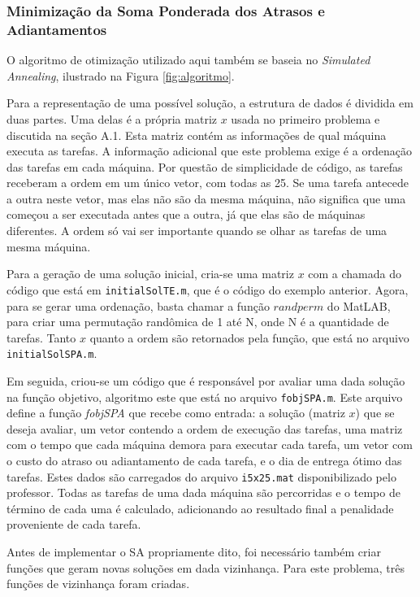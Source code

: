 \documentclass[conference]{IEEEtran}
\begin{document}
\subsubsection{Minimização da Soma Ponderada dos Atrasos e Adiantamentos}
O algoritmo de otimização utilizado aqui também se baseia no \textit{Simulated Annealing}, ilustrado na Figura \ref{fig:algoritmo}.

Para a representação de uma possível solução, a estrutura de dados é dividida em duas partes. Uma delas é a própria matriz $x$ usada no primeiro problema e discutida na seção A.1. Esta matriz contém as informações de qual máquina executa as tarefas. A informação adicional que este problema exige é a ordenação das tarefas em cada máquina. Por questão de simplicidade de código, as tarefas receberam a ordem em um único vetor, com todas as 25. Se uma tarefa antecede a outra neste vetor, mas elas não são da mesma máquina, não significa que uma começou a ser executada antes que a outra, já que elas são de máquinas diferentes. A ordem só vai ser importante quando se olhar as tarefas de uma mesma máquina. 

Para a geração de uma solução inicial, cria-se uma matriz $x$ com a chamada do código que está em \texttt{initialSolTE.m}, que é o código do exemplo anterior. Agora, para se gerar uma ordenação, basta chamar a função $randperm$ do MatLAB, para criar uma permutação randômica de 1 até N, onde N é a quantidade de tarefas. Tanto $x$ quanto a ordem são retornados pela função, que está no arquivo \texttt{initialSolSPA.m}.

Em seguida, criou-se um código que é responsável por avaliar uma dada solução na função objetivo, algoritmo este que está no arquivo \texttt{fobjSPA.m}. Este arquivo define a função \emph{fobjSPA} que recebe como entrada: a solução (matriz $x$) que se deseja avaliar, um vetor contendo a ordem de execução das tarefas, uma matriz com o tempo que cada máquina demora para executar cada tarefa, um vetor com o custo do atraso ou adiantamento de cada tarefa, e o dia de entrega ótimo das tarefas. Estes dados são carregados do arquivo \texttt{i5x25.mat} disponibilizado pelo professor. Todas as tarefas de uma dada máquina são percorridas e o tempo de término de cada uma é calculado, adicionando ao resultado final a penalidade proveniente de cada tarefa.

Antes de implementar o SA propriamente dito, foi necessário também criar funções que geram novas soluções em dada vizinhança. Para este problema, três funções de vizinhança foram criadas.
\end{document}
